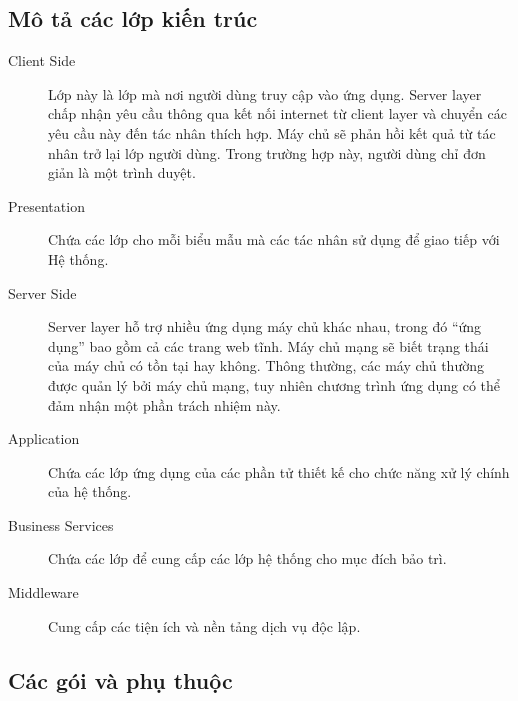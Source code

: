 \documentclass[./../main.tex]{subfiles}
\begin{document}
	\subsection{Mô tả các lớp kiến trúc}
	\begin{description}
		\item[Client Side] Lớp này là lớp mà nơi người dùng truy cập vào ứng dụng. Server layer chấp nhận yêu cầu thông qua kết nối internet từ client layer và chuyển các yêu cầu này đến tác nhân thích hợp. Máy chủ sẽ phản hồi kết quả từ tác nhân trở lại lớp người dùng. Trong trường hợp này, người dùng chỉ đơn giản là một trình duyệt.
		\item[Presentation] Chứa các lớp cho mỗi biểu mẫu mà các tác nhân sử dụng để giao tiếp với Hệ thống.
		\item[Server Side] Server layer hỗ trợ nhiều ứng dụng máy chủ khác nhau, trong đó “ứng dụng” bao gồm cả các trang web tĩnh. Máy chủ mạng sẽ biết trạng thái của máy chủ có tồn tại hay không. Thông thường, các máy chủ thường được quản lý bởi máy chủ mạng, tuy nhiên chương trình ứng dụng có thể đảm nhận một phần trách nhiệm này.
		\item[Application] Chứa các lớp ứng dụng của các phần tử thiết kế cho chức năng xử lý chính của hệ thống.
		\item[Business Services] Chứa các lớp để cung cấp các lớp hệ thống cho mục đích bảo trì.
		\item[Middleware] Cung cấp các tiện ích và nền tảng dịch vụ độc lập.
		
	\end{description}
	\subsection{Các gói và phụ thuộc}
\end{document}
